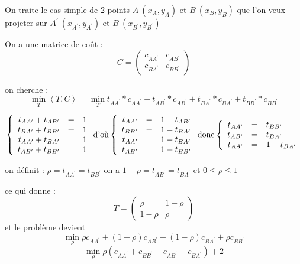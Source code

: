 
On traite le cas simple de 2 points $A\ (x_A, y_A)$ et $B\ (x_B, y_B)$ 
que l'on veux projeter sur $A^\prime\ (x_{A^\prime}, y_{A^\prime})$ et $B\ (x_{B^\prime}, y_{B^\prime})$ 

On a une matrice de coût :
$$
C = 
\begin{pmatrix}
   c_{AA^\prime} & c_{AB^\prime} \\
   c_{BA^\prime} & c_{BB^\prime} 
\end{pmatrix}
$$

on cherche : 
\begin{equation}
\min_T \left<T,C\right> = \min_{T} 
t_{AA^\prime}*c_{AA^\prime} + 
t_{AB^\prime}*c_{AB^\prime} + 
t_{BA^\prime}*c_{BA^\prime} + 
t_{BB^\prime}*c_{BB^\prime}
\end{equation}

\begin{equation}
\left \{
\begin{array}{r c l}
  t_{AA^\prime} + t_{AB^\prime}  & = & 1 \\
  t_{BA^\prime} + t_{BB^\prime}  & = & 1 \\
  t_{AA^\prime} + t_{BA^\prime}  & = & 1 \\
  t_{AB^\prime} + t_{BB^\prime}  & = & 1 \\
\end{array}
\right .
\text{d'où}
\left \{
\begin{array}{r c l}
  t_{AA^\prime}  & = & 1 - t_{AB^\prime}\\
  t_{BB^\prime}  & = & 1 - t_{BA^\prime}\\
  t_{AA^\prime}  & = & 1 - t_{BA^\prime}\\
  t_{AB^\prime}  & = & 1 - t_{BB^\prime}\\
\end{array}
\right .
\text{donc}
\left \{
\begin{array}{r c l}
  t_{AA^\prime}  & = & t_{BB^\prime}\\
  t_{AB^\prime}  & = & t_{BA^\prime}\\
  t_{AA^\prime}  & = & 1 - t_{BA^\prime}\\
\end{array}
\right .
\end{equation}

on définit : $\rho = t_{AA^\prime} = t_{BB^\prime}$ on a $1-\rho = t_{AB^\prime} = t_{BA^\prime}$ et $0\leq \rho\leq 1$

ce qui donne :
$$
T = 
\begin{pmatrix}
   \rho & 1-\rho \\
   1- \rho & \rho
\end{pmatrix}
$$
et le problème devient
\begin{equation}
\min_\rho \rho c_{AA^\prime} + (1- \rho) c_{AB^\prime} + (1-\rho) c_{BA^\prime} + \rho c_{BB^\prime}
\end{equation}
\begin{equation}
\min_\rho \rho (c_{AA^\prime} + c_{BB^\prime} - c_{AB^\prime} - c_{BA^\prime}) + 2
\end{equation}

